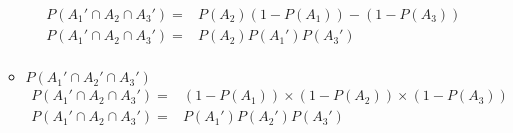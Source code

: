 \documentclass{article}
\begin{document}
\begin{enumerate}
\begin{itemize}
\begin{equation}
\begin{aligned}
        P(A_1' \cap A_2 \cap A_3') = & P(A_2) (1 - P(A_1)) - (1 - P(A_3)) \\
        P(A_1' \cap A_2 \cap A_3') = & P(A_2) P(A_1') P(A_3') \\
        \end{aligned}
        \end{equation}
    \item $P(A_1' \cap A_2' \cap A_3')$
        \begin{equation}
        \begin{aligned}
        P(A_1' \cap A_2 \cap A_3') = & (1 - P(A_1)) \times (1 - P(A_2)) \times (1 - P(A_3)) \\
        P(A_1' \cap A_2 \cap A_3') = & P(A_1') P(A_2') P(A_3') \\
        \end{aligned}
        \end{equation}
    \end{itemize}
\end{enumerate}
\end{document}
